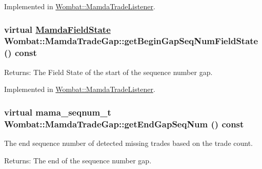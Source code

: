 Implemented in \hyperlink{classWombat_1_1MamdaTradeListener_62f2fd151a022948527e1f6ed74ced3d}{Wombat::Mamda\-Trade\-Listener}.\hypertarget{classWombat_1_1MamdaTradeGap_891a25b9fc967b839326754b5cc8010e}{
\subsubsection[getBeginGapSeqNumFieldState]{\setlength{\rightskip}{0pt plus 5cm}virtual \hyperlink{namespaceWombat_93aac974f2ab713554fd12a1fa3b7d2a}{Mamda\-Field\-State} Wombat::Mamda\-Trade\-Gap::get\-Begin\-Gap\-Seq\-Num\-Field\-State () const}}
\label{classWombat_1_1MamdaTradeGap_891a25b9fc967b839326754b5cc8010e}


\begin{Desc}
\item[Returns:]The Field State of the start of the sequence number gap. \end{Desc}


Implemented in \hyperlink{classWombat_1_1MamdaTradeListener_95aa1252a009b9d4805205cf776557eb}{Wombat::Mamda\-Trade\-Listener}.\hypertarget{classWombat_1_1MamdaTradeGap_585fad255869d86be104a783d14987ca}{
\subsubsection[getEndGapSeqNum]{\setlength{\rightskip}{0pt plus 5cm}virtual mama\_\-seqnum\_\-t Wombat::Mamda\-Trade\-Gap::get\-End\-Gap\-Seq\-Num () const}}
\label{classWombat_1_1MamdaTradeGap_585fad255869d86be104a783d14987ca}


The end sequence number of detected missing trades based on the trade count. 

\begin{Desc}
\item[Returns:]The end of the sequence number gap. \end{Desc}


